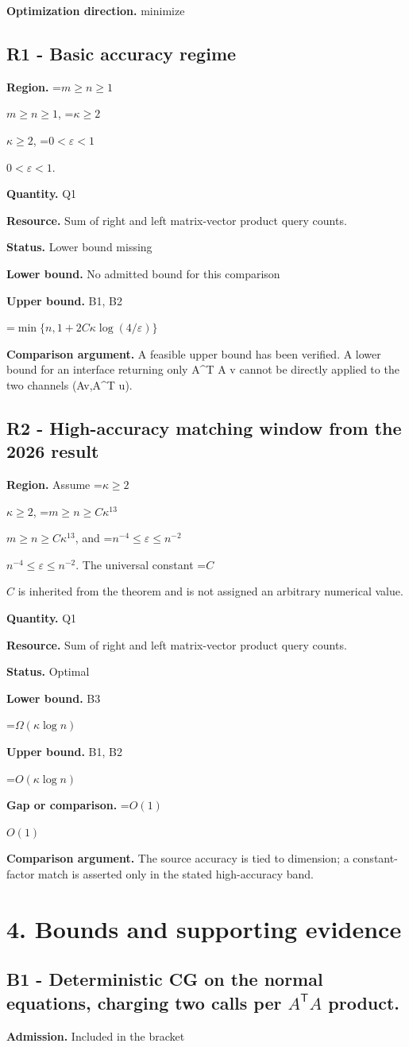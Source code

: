 \documentclass[10pt,a4paper]{article}
\newcommand{\AtlasMath}[1]{\par\begingroup\centering\setbox0=\hbox{$\displaystyle #1$}\ifdim\wd0>1.4\linewidth\typeout{ATLAS WIDE FORMULA: \the\wd0}\fi\ifdim\wd0>\linewidth\resizebox{\linewidth}{!}{\box0}\else\box0\fi\par\endgroup}
\newcommand{\AtlasInlineMath}[1]{\begingroup\setbox0=\hbox{$#1$}\ifdim\wd0>.4\linewidth\endgroup\AtlasMath{#1}\else\endgroup$#1$\fi}
\begin{document}
\textbf{Optimization direction.} minimize

\subsection{R1 - Basic accuracy regime}
\textbf{Region.} \AtlasInlineMath{m\ge n\ge1}, \AtlasInlineMath{\kappa\ge2}, \AtlasInlineMath{0<\varepsilon<1}.

\textbf{Quantity.} Q1

\textbf{Resource.} Sum of right and left matrix-vector product query counts.

\textbf{Status.} Lower bound missing

\textbf{Lower bound.} No admitted bound for this comparison

\textbf{Upper bound.} B1, B2

\AtlasMath{\min\{n,1+2C\kappa\log(4/\varepsilon)\}}
\textbf{Comparison argument.} A feasible upper bound has been verified. A lower bound for an interface returning only A\textasciicircum{}T A v cannot be directly applied to the two channels (Av,A\textasciicircum{}T u).

\subsection{R2 - High-accuracy matching window from the 2026 result}
\textbf{Region.} Assume \AtlasInlineMath{\kappa\ge2}, \AtlasInlineMath{m\ge n\ge C\kappa^{13}}, and \AtlasInlineMath{n^{-4}\le\varepsilon\le n^{-2}}. The universal constant \AtlasInlineMath{C} is inherited from the theorem and is not assigned an arbitrary numerical value.

\textbf{Quantity.} Q1

\textbf{Resource.} Sum of right and left matrix-vector product query counts.

\textbf{Status.} Optimal

\textbf{Lower bound.} B3

\AtlasMath{\Omega(\kappa\log n)}
\textbf{Upper bound.} B1, B2

\AtlasMath{O(\kappa\log n)}
\textbf{Gap or comparison.} \AtlasInlineMath{O(1)}

\textbf{Comparison argument.} The source accuracy is tied to dimension; a constant-factor match is asserted only in the stated high-accuracy band.

\section{4. Bounds and supporting evidence}
\subsection{B1 - Deterministic CG on the normal equations, charging two calls per $A^{\mathsf T}A$ product.}
\textbf{Admission.} Included in the bracket
\end{document}
